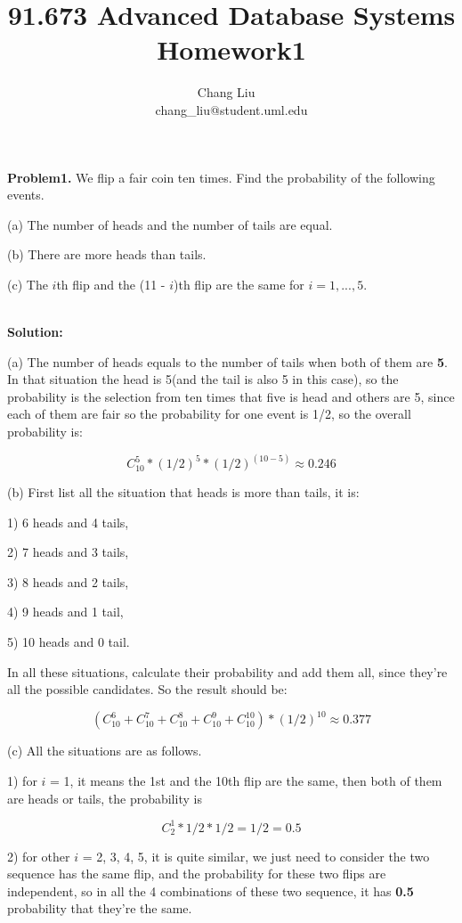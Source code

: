 \documentclass{article}
\author{Chang Liu ~\\ chang\_liu@student.uml.edu}
\title{91.673 Advanced Database Systems Homework1}
\begin{document}
\maketitle



\noindent \textbf{Problem1.} We flip a fair coin ten times. Find the probability of the following events.

(a) The number of heads and the number of tails are equal.

(b) There are more heads than tails.

(c) The $i$th flip and the (11 - $i$)th flip are the same for $i = 1, . . . , 5$. 

~\\

\noindent \textbf{Solution:}

(a) The number of heads equals to the number of tails when both of them are \textbf{5}. In that situation the head is 5(and the tail is also 5 in this case), so the probability is the selection from ten times that five is head and others are 5, since each of them are fair so the probability for one event is 1/2, so the overall probability is:

$$C_{10}^5 * (1/2)^5 * (1/2)^{(10-5)} \approx 0.246$$

(b) First list all the situation that heads is more than tails, it is:

1) 6 heads and 4 tails, 

2) 7 heads and 3 tails,

3) 8 heads and 2 tails, 

4) 9 heads and 1 tail, 

5) 10 heads and 0 tail. 

In all these situations, calculate their probability and add them all, since they're all the possible candidates. So the result should be:

$$ (C_{10}^6 + C_{10}^7 + C_{10}^8 + C_{10}^9 + C_{10}^10) * (1/2)^{10} \approx 0.377$$


(c) All the situations are as follows.

1) for $i$ = 1, it means the 1st and the 10th flip are the same, then both of them are heads or tails, the probability is 

$$ C_2^1 * 1/2 * 1/2 = 1/2 = 0.5$$

2) for other $i$ = 2, 3, 4, 5, it is quite similar, we just need to consider the two sequence has the same flip, and the probability for these two flips are independent, so in all the 4 combinations of these two sequence, it has \textbf{0.5} probability that they're the same.
\end{document}
